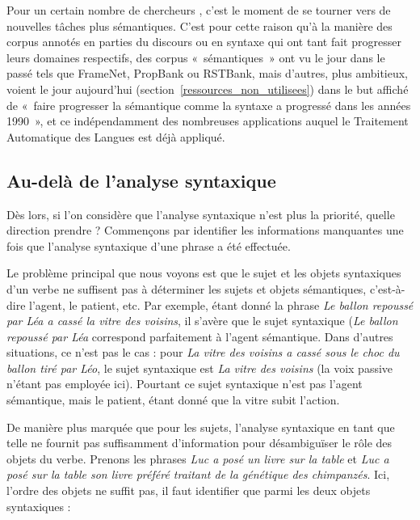 Pour un certain nombre de chercheurs
\citep{bos2012annotating,banarescu2013abstract}, c'est le moment de se tourner
vers de nouvelles tâches plus sémantiques. C'est pour cette raison qu'à la
manière des corpus annotés en parties du discours ou en syntaxe qui ont tant
fait progresser leurs domaines respectifs, des corpus «~sémantiques~» ont vu le
jour dans le passé tels que FrameNet, PropBank ou RSTBank, mais d'autres, plus
ambitieux, voient le jour aujourd'hui
\citep{bos2012annotating,banarescu2013abstract}
(section~\ref{ressources_non_utilisees}) dans le but affiché de «~faire
progresser la sémantique comme la syntaxe a progressé dans les années 1990~»,
et ce indépendamment des nombreuses applications auquel le Traitement
Automatique des Langues est déjà appliqué.

\subsection{Au-delà de l'analyse syntaxique}
\label{au_dela}

Dès lors, si l'on considère que l'analyse syntaxique n'est plus la priorité,
quelle direction prendre ? Commençons par identifier les informations
manquantes une fois que l'analyse syntaxique d'une phrase a été effectuée.

Le problème principal que nous voyons est que le sujet et les objets
syntaxiques d'un verbe ne suffisent pas à déterminer les sujets et objets
sémantiques, c'est-à-dire l'agent, le patient, etc. Par exemple, étant donné la
phrase \emph{Le ballon repoussé par Léa a cassé la vitre des voisins}, il
s'avère que le sujet syntaxique (\emph{Le ballon repoussé par Léa} correspond
parfaitement à l'agent sémantique.  Dans d'autres situations, ce n'est pas le
cas : pour \emph{La vitre des voisins a cassé sous le choc du ballon tiré par
Léo}, le sujet syntaxique est \emph{La vitre des voisins} (la voix passive
n'étant pas employée ici). Pourtant ce sujet syntaxique n'est pas l'agent
sémantique, mais le patient, étant donné que la vitre subit l'action.

De manière plus marquée que pour les sujets, l'analyse syntaxique en tant que
telle ne fournit pas suffisamment d'information pour désambiguïser le rôle des
objets du verbe.  Prenons les phrases \emph{Luc a posé un livre sur la table}
et \emph{Luc a posé sur la table son livre préféré traitant de la génétique des
chimpanzés}.  Ici, l'ordre des objets ne suffit pas, il faut identifier que
parmi les deux objets syntaxiques :

